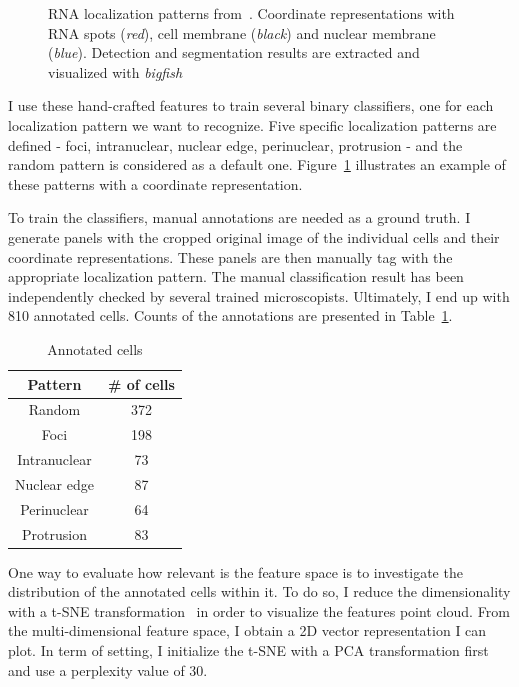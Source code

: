 \begin{figure}[]
	\endminipage
	\caption{RNA localization patterns from~\cite{CHOUAIB_2020}.
	Coordinate representations with RNA spots (\textit{red}), cell membrane (\textit{black}) and nuclear membrane (\textit{blue}).
	Detection and segmentation results are extracted and visualized with \emph{bigfish}}
	\label{fig:localization_patterns_racha_features}
\end{figure}

I use these hand-crafted features to train several binary classifiers, one for each localization pattern we want to recognize.
Five specific localization patterns are defined - foci, intranuclear, nuclear edge, perinuclear, protrusion - and the random pattern is considered as a default one.
Figure~\ref{fig:localization_patterns_racha_features} illustrates an example of these patterns with a coordinate representation.

To train the classifiers, manual annotations are needed as a ground truth.
I generate panels with the cropped original image of the individual cells and their coordinate representations.
These panels are then manually tag with the appropriate localization pattern.
The manual classification result has been independently checked by several trained microscopists.
Ultimately, I end up with 810 annotated cells.
Counts of the annotations are presented in Table~\ref{table:real_dataset_chapter5}.

\begin{table}
	\centering
	\begin{tabular}{| c | c |}
		\hline
		Pattern & \# of cells \\
		\hline
		Random & 372\\
		Foci & 198\\
		Intranuclear & 73\\
		Nuclear edge & 87\\
		Perinuclear & 64\\
		Protrusion & 83\\
		\hline
	\end{tabular}
	\caption{Annotated cells}
	\label{table:real_dataset_chapter5}
\end{table}

One way to evaluate how relevant is the feature space is to investigate the distribution of the annotated cells within it.
To do so, I reduce the dimensionality with a \ac{t-SNE} transformation~\cite{vandermaaten_2008} in order to visualize the features point cloud.
From the multi-dimensional feature space, I obtain a 2D vector representation I can plot.
In term of setting, I initialize the \ac{t-SNE} with a PCA transformation first and use a perplexity value of 30.

